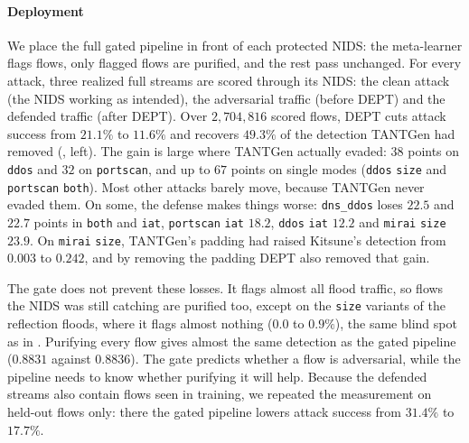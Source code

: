 \documentclass[acmtog,nonacm,pbalance]{acmart}
\newcommand{\src}[1]{\texttt{#1}}
\newcommand{\dmode}[1]{\texttt{#1}}
\begin{document}
\paragraph{Deployment} We place the full gated pipeline in front of each
protected NIDS: the meta-learner flags flows, only flagged flows are purified,
and the rest pass unchanged. For every attack, three realized full streams are
scored through its NIDS: the clean attack (the NIDS working as intended), the
adversarial traffic (before DEPT) and the defended traffic (after DEPT). Over
$2{,}704{,}816$ scored flows, DEPT cuts attack success from $21.1\%$ to $11.6\%$
and recovers $49.3\%$ of the detection TANTGen had removed
(, left). The gain is large where TANTGen actually evaded: $38$
points on \src{ddos} and $32$ on \src{portscan}, and up to $67$ points on single
modes (\src{ddos} \dmode{size} and \src{portscan} \dmode{both}). Most other
attacks barely move, because TANTGen never evaded them. On some, the defense
makes things worse: \src{dns\_ddos} loses $22.5$ and $22.7$ points in
\dmode{both} and \dmode{iat}, \src{portscan} \dmode{iat} $18.2$, \src{ddos}
\dmode{iat} $12.2$ and \src{mirai} \dmode{size} $23.9$. On \src{mirai}
\dmode{size}, TANTGen's padding had raised Kitsune's detection from $0.003$ to
$0.242$, and by removing the padding DEPT also removed that gain.

The gate does not prevent these losses. It flags almost all flood traffic, so
flows the NIDS was still catching are purified too, except on the \dmode{size}
variants of the reflection floods, where it flags almost nothing ($0.0$ to
$0.9\%$), the same blind spot as in . Purifying every flow
gives almost the same detection as the gated pipeline ($0.8831$ against
$0.8836$). The gate predicts whether a flow is adversarial, while the pipeline
needs to know whether purifying it will help. Because the defended streams also
contain flows seen in training, we repeated the measurement on held-out flows
only: there the gated pipeline lowers attack success from $31.4\%$ to $17.7\%$.
\end{document}
